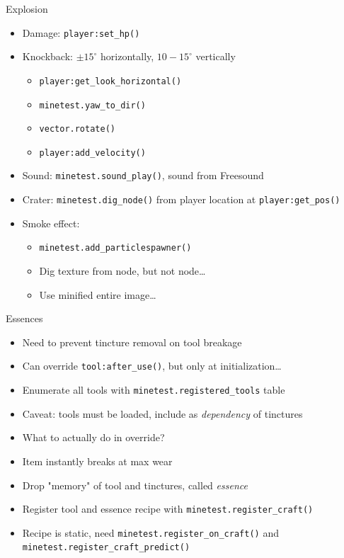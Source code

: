 \documentclass{beamer}
\begin{document}
\begin{frame}{Explosion}
\begin{itemize}
	\item Damage: \texttt{player:set\_hp()}
	\item Knockback: $\pm 15^{\circ}$ horizontally, $10-15^{\circ}$ vertically
	\begin{itemize}
		\item \texttt{player:get\_look\_horizontal()}
		\item \texttt{minetest.yaw\_to\_dir()}
		\item \texttt{vector.rotate()}
		\item \texttt{player:add\_velocity()}
	\end{itemize}
	\item Sound: \texttt{minetest.sound\_play()}, sound from Freesound
	\item Crater: \texttt{minetest.dig\_node()} from player location at \texttt{player:get\_pos()}
	\item Smoke effect:
	\begin{itemize}
		\item \texttt{minetest.add\_particlespawner()}
		\item Dig texture from node, but not node\ldots
		\item Use minified entire image\ldots
	\end{itemize}
\end{itemize}
\end{frame}

\begin{frame}{Essences}
\begin{itemize}
	\item Need to prevent tincture removal on tool breakage
	\item Can override \texttt{tool:after\_use()}, but only at initialization\ldots
	\item Enumerate all tools with \texttt{minetest.registered\_tools} table
	\item Caveat: tools must be loaded, include as \emph{dependency} of tinctures
	\item What to actually do in override?
	\item Item instantly breaks at max wear
	\item Drop "memory" of tool and tinctures, called \emph{essence}
	\item Register tool and essence recipe with \texttt{minetest.register\_craft()}
	\item Recipe is static, need \texttt{minetest.register\_on\_craft()} and \texttt{minetest.register\_craft\_predict()}
\end{itemize}
\end{frame}
\end{document}
